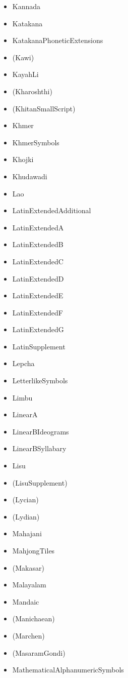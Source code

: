 \documentclass{article}
\newenvironment{itemlist}{%
  \begin{itemize}
  \setlength{\itemsep}{0pt}
  \setlength{\parsep}{0pt}
  \setlength{\topsep}{0pt}
  \setlength{\partopsep}{0pt}
  \setlength{\parskip}{0pt}
  \setlength{\labelsep}{5pt}}%
{
  \end{itemize}}
\begin{document}
\begin{multicols*}{2}
\begin{itemlist}
        \item Kannada
        \item Katakana
        \item KatakanaPhoneticExtensions
        \item (Kawi)
        \item KayahLi
        \item (Kharoshthi)
        \item (KhitanSmallScript)
        \item Khmer
        \item KhmerSymbols
        \item Khojki
        \item Khudawadi
        \item Lao
        \item LatinExtendedAdditional
        \item LatinExtendedA
        \item LatinExtendedB
        \item LatinExtendedC
        \item LatinExtendedD
        \item LatinExtendedE
        \item LatinExtendedF
        \item LatinExtendedG
        \item LatinSupplement
        \item Lepcha
        \item LetterlikeSymbols
        \item Limbu
        \item LinearA
        \item LinearBIdeograms
        \item LinearBSyllabary
        \item Lisu
        \item (LisuSupplement)
        \item (Lycian)
        \item (Lydian)
        \item Mahajani
        \item MahjongTiles
        \item (Makasar)
        \item Malayalam
        \item Mandaic
        \item (Manichaean)
        \item (Marchen)
        \item (MasaramGondi)
        \item MathematicalAlphanumericSymbols

\end{itemlist}
\end{multicols*}
\end{document}
